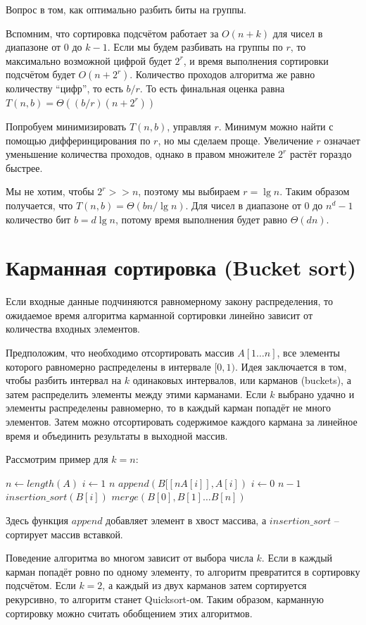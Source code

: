 \documentclass[a4paper,11pt]{article}
\begin{document}
Вопрос в том, как оптимально разбить биты на группы.

Вспомним, что сортировка подсчётом работает за $O(n+k)$ для чисел в диапазоне от
0 до $k-1$. Если мы будем разбивать на группы по $r$, то максимально возможной 
цифрой будет $2^r$, и время выполнения сортировки подсчётом будет $O(n + 2^r)$.
Количество проходов алгоритма же равно количеству ``цифр'', то есть $b/r$. То
есть финальная оценка равна $T(n,b) = \Theta((b/r)(n+2^r))$

Попробуем минимизировать $T(n,b)$, управляя $r$. Минимум можно найти с помощью
дифферинцирования по $r$, но мы сделаем проще. Увеличение $r$ означает уменьшение
количества проходов, однако в правом множителе $2^r$ растёт гораздо быстрее.

Мы не хотим, чтобы $2^r >> n$, поэтому мы выбираем $r = \lg n$. Таким образом
получается, что $T(n, b) = \Theta(bn/\lg n)$. Для чисел в диапазоне от 0 до
$n^d - 1$ количество бит $b = d \lg n$, потому время выполнения будет равно
$\Theta(dn)$.

\section{Карманная сортировка (Bucket sort)}
Если входные данные подчиняются равномерному закону распределения, то ожидаемое
время алгоритма карманной сортировки линейно зависит от количества входных
элементов.

Предположим, что необходимо отсортировать массив $A[1 \ldots n]$, все элементы
которого равномерно распределены в интервале $[0, 1)$. Идея заключается в том,
чтобы разбить интервал на $k$ одинаковых интервалов, или карманов (buckets), а
затем распределить элементы между этими карманами. Если $k$ выбрано удачно и
элементы распределены равномерно, то в каждый карман попадёт не много элементов.
Затем можно отсортировать содержимое каждого кармана за линейное время и
объединить результаты в выходной массив.

Рассмотрим пример для $k = n$:

\begin{codebox}
\li $n \gets length(A)$
\li \For $i \gets 1 $ \To $n$
\li      \Do $append(B[[nA[i]], A[i])$
  \End
\li \For $i \gets 0 $ \To $n-1$
\li      \Do $insertion\_sort(B[i])$
  \End
\li $merge(B[0], B[1] \ldots B[n])$
\end{codebox}

Здесь функция $append$ добавляет элемент в хвост массива, а $insertion\_sort$ --
сортирует массив вставкой.

Поведение алгоритма во многом зависит от выбора числа $k$. Если в каждый карман
попадёт ровно по одному элементу, то алгоритм превратится в сортировку
подсчётом. Если $k = 2$, а каждый из двух карманов затем сортируется рекурсивно,
то алгоритм станет Quicksort-ом. Таким образом, карманную сортировку можно
считать обобщением этих алгоритмов.
\end{document}
